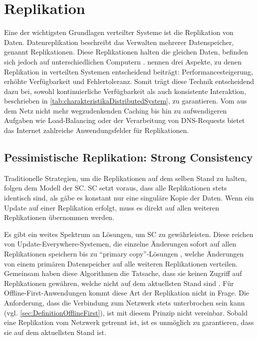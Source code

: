 \documentclass[a4paper, 12pt]{scrreprt}
\begin{document}
\section{Replikation}

Eine der wichtigsten Grundlagen verteilter Systeme ist die Replikation von Daten. Datenreplikation beschreibt das Verwalten mehrerer Datenspeicher, genannt Replikationen. Diese Replikationen halten die gleichen Daten, befinden sich jedoch auf unterschiedlichen Computern \autocite[S. 42]{ArticleOptimisticReplication}. \citet{BookDistributedSystemsConceptsAndDesign} nennen drei Aspekte, zu denen Replikation in verteilten Systemen entscheidend beiträgt: Performancesteigerung, erhöhte Verfügbarkeit und Fehlertoleranz. Somit trägt diese Technik entscheidend dazu bei, sowohl kontinuierliche Verfügbarkeit als auch konsistente Interaktion, beschrieben in \ref{tab:charakteristikaDistributedSystem}, zu garantieren. Vom aus dem Netz nicht mehr wegzudenkenden Caching bis hin zu aufwendigeren Aufgaben wie Load-Balancing oder der Verarbeitung von DNS-Requests bietet das Internet zahlreiche Anwendungsfelder für Replikationen. 

\subsection{Pessimistische Replikation: Strong Consistency}

Traditionelle Strategien, um die Replikationen auf dem selben Stand zu halten, folgen dem Modell der \ac{SC}. \ac{SC} setzt voraus, dass alle Replikationen stets identisch sind, als gäbe es konstant nur eine singuläre Kopie der Daten. Wenn ein Update auf einer Replikation erfolgt, muss es direkt auf allen weiteren Replikationen übernommen werden. 

Es gibt ein weites Spektrum an Lösungen, um \ac{SC} zu gewährleisten. Diese reichen von {Update-Everywhere}-Systemen, die einzelne Änderungen sofort auf allen Replikationen speichern \autocite{ThesisUpdateEverywhere} bis zu \enquote{primary copy}-Lösungen \autocite[S. 14]{BookPrimaryReplica}, welche Änderungen von einem primären Datenspeicher auf alle weiteren Replikationen verteilen. Gemeinsam haben diese Algorithmen die Tatsache, dass sie keinen Zugriff auf Replikationen gewähren, welche nicht auf dem aktuellsten Stand sind \autocite[S. 43]{ArticleOptimisticReplication}. Für Offline-First-Anwendungen kommt diese Art der Replikation nicht in Frage. Die Anforderung, dass die Verbindung zum Netzwerk stets unterbrochen sein kann (vgl. \ref{sec:DefinitionOfflineFirst}), ist mit diesem Prinzip nicht vereinbar. Sobald eine Replikation vom Netzwerk getrennt ist, ist es unmöglich zu garantieren, dass sie auf dem aktuellsten Stand ist.
\end{document}
